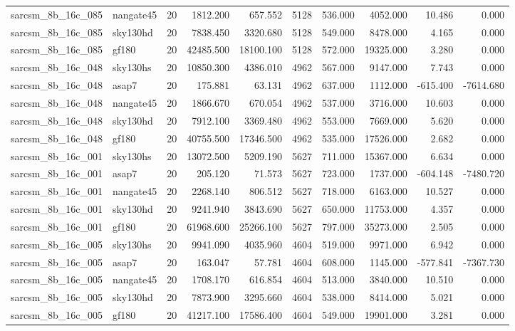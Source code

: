 \begin{tabular}{llrrrrrrrr}
sarcsm\_8b\_16c\_085 & nangate45 & 20 & 1812.200 & 657.552 & 5128 & 536.000 & 4052.000 & 10.486 & 0.000 \\
sarcsm\_8b\_16c\_085 & sky130hd & 20 & 7838.450 & 3320.680 & 5128 & 549.000 & 8478.000 & 4.165 & 0.000 \\
sarcsm\_8b\_16c\_085 & gf180 & 20 & 42485.500 & 18100.100 & 5128 & 572.000 & 19325.000 & 3.280 & 0.000 \\
sarcsm\_8b\_16c\_048 & sky130hs & 20 & 10850.300 & 4386.010 & 4962 & 567.000 & 9147.000 & 7.743 & 0.000 \\
sarcsm\_8b\_16c\_048 & asap7 & 20 & 175.881 & 63.131 & 4962 & 637.000 & 1112.000 & -615.400 & -7614.680 \\
sarcsm\_8b\_16c\_048 & nangate45 & 20 & 1866.670 & 670.054 & 4962 & 537.000 & 3716.000 & 10.603 & 0.000 \\
sarcsm\_8b\_16c\_048 & sky130hd & 20 & 7912.100 & 3369.480 & 4962 & 553.000 & 7669.000 & 5.620 & 0.000 \\
sarcsm\_8b\_16c\_048 & gf180 & 20 & 40755.500 & 17346.500 & 4962 & 535.000 & 17526.000 & 2.682 & 0.000 \\
sarcsm\_8b\_16c\_001 & sky130hs & 20 & 13072.500 & 5209.190 & 5627 & 711.000 & 15367.000 & 6.634 & 0.000 \\
sarcsm\_8b\_16c\_001 & asap7 & 20 & 205.120 & 71.573 & 5627 & 723.000 & 1737.000 & -604.148 & -7480.720 \\
sarcsm\_8b\_16c\_001 & nangate45 & 20 & 2268.140 & 806.512 & 5627 & 718.000 & 6163.000 & 10.527 & 0.000 \\
sarcsm\_8b\_16c\_001 & sky130hd & 20 & 9241.940 & 3843.690 & 5627 & 650.000 & 11753.000 & 4.357 & 0.000 \\
sarcsm\_8b\_16c\_001 & gf180 & 20 & 61968.600 & 25266.100 & 5627 & 797.000 & 35273.000 & 2.505 & 0.000 \\
sarcsm\_8b\_16c\_005 & sky130hs & 20 & 9941.090 & 4035.960 & 4604 & 519.000 & 9971.000 & 6.942 & 0.000 \\
sarcsm\_8b\_16c\_005 & asap7 & 20 & 163.047 & 57.781 & 4604 & 608.000 & 1145.000 & -577.841 & -7367.730 \\
sarcsm\_8b\_16c\_005 & nangate45 & 20 & 1708.170 & 616.854 & 4604 & 513.000 & 3840.000 & 10.510 & 0.000 \\
sarcsm\_8b\_16c\_005 & sky130hd & 20 & 7873.900 & 3295.660 & 4604 & 538.000 & 8414.000 & 5.021 & 0.000 \\
sarcsm\_8b\_16c\_005 & gf180 & 20 & 41217.100 & 17586.400 & 4604 & 549.000 & 19901.000 & 3.281 & 0.000 \\

\end{tabular}
